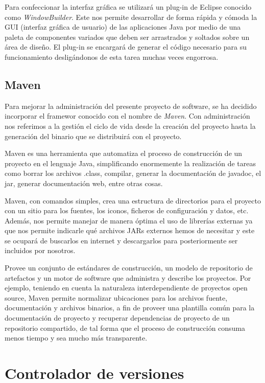 \documentclass{book}
\begin{document}
Para confeccionar la interfaz gráfica se utilizará un plug-in de Eclipse conocido como \textit{WindowBuilder}. Este nos permite desarrollar de forma rápida y cómoda la GUI (interfaz gráfica de usuario) de las aplicaciones Java por medio de una paleta de componentes variados que deben ser arrastrados y soltados sobre un área de diseño. El plug-in se encargará de generar el código necesario para su funcionamiento desligándonos de esta tarea muchas veces engorrosa.
\medskip


\subsection{Maven}

Para mejorar la administración del presente proyecto de software, se ha decidido incorporar el framewor conocido con el nombre de \textit{Maven}. Con administración nos referimos a la gestión el ciclo de vida desde la creación del proyecto hasta la generación del binario que se distribuirá con el proyecto.
\par
Maven es una herramienta que automatiza el proceso de construcción de un proyecto en el lenguaje Java, simplificando enormemente la realización de tareas como borrar los archivos .class, compilar, generar la documentación de javadoc, el jar, generar documentación web, entre otras cosas.
\par
Maven, con comandos simples, crea una estructura de directorios para el proyecto con un sitio para los fuentes, los iconos, ficheros de configuración y datos, etc. Además, nos permite manejar de manera óptima el uso de librerías externas ya que nos permite indicarle qué archivos JARs externos hemos de necesitar y este se ocupará de buscarlos en internet y descargarlos para posteriormente ser incluidos por nosotros.
\par
Provee un conjunto de estándares de construcción, un modelo de repositorio de artefactos y un motor de software que administra y describe los proyectos. Por ejemplo, teniendo en cuenta la naturaleza interdependiente de proyectos open source, Maven permite normalizar ubicaciones para los archivos fuente, documentación y archivos binarios, a fin de proveer una plantilla común para la documentación de proyecto y recuperar dependencias de proyecto de un repositorio compartido, de tal forma que el proceso de construcción consuma menos tiempo y sea mucho más transparente.
\medskip


\section{Controlador de versiones}
\end{document}
